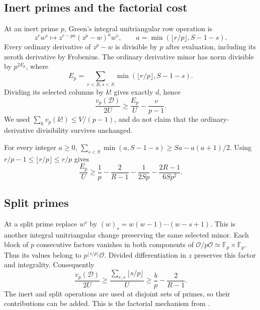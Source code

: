 \documentclass[11pt]{article}
\newcommand{\F}{\mathbb F}
\newcommand{\OO}{\mathcal O}
\begin{document}
\subsection{Inert primes and the factorial cost}
At an inert prime $p$, Green's integral unitriangular row operation is
\[
 z^rw^s\longmapsto z^{r-pa}(z^p-w)^aw^s,
 \qquad a=\min(\lfloor r/p\rfloor,S-1-s).
\]
Every ordinary derivative of $z^p-w$ is divisible by $p$ after
evaluation, including its zeroth derivative by Frobenius. The
ordinary derivative minor has norm divisible by $p^{2E_p}$, where
\[
 E_p=\sum_{r<R,s<S}\min(\lfloor r/p\rfloor,S-1-s).
\]
Dividing its selected columns by $k!$ gives exactly $d$, hence
\begin{equation}\label{eq:inert-raw}
 \frac{v_p(\mathcal D)}{2U}
 \ge\frac{E_p}{U}-\frac v{p-1}.
\end{equation}
We used $\sum_k v_p(k!)\le V/(p-1)$, and do not claim that
the ordinary-derivative divisibility survives unchanged.

For every integer $a\ge0$,
$\sum_{s<S}\min(a,S-1-s)\ge Sa-a(a+1)/2$.
Using $r/p-1\le\lfloor r/p\rfloor\le r/p$ gives
\begin{equation}\label{eq:E}
 \frac{E_p}{U}\ge
 \frac1p-\frac2{R-1}-\frac1{2Sp}
              -\frac{2R-1}{6Sp^2}.
\end{equation}

\subsection{Split primes}
At a split prime replace $w^s$ by
$(w)_s=w(w-1)\cdots(w-s+1)$. This is another integral
unitriangular change preserving the same selected minor. Each block
of $p$ consecutive factors vanishes in both components of
$\OO/p\OO\simeq\F_p\times\F_p$. Thus its values belong to
$p^{\lfloor s/p\rfloor}\OO$. Divided differentiation in $z$
preserves this factor and integrality. Consequently
\begin{equation}\label{eq:split}
 \frac{v_p(\mathcal D)}{2U}
 \ge\frac{\sum_{r,s}\lfloor s/p\rfloor}{U}
 \ge\frac bp-\frac2{R-1}.
\end{equation}
The inert and split operations are used at disjoint sets of primes,
so their contributions can be added. This is the factorial mechanism
from \cite[Section 4.3]{v7}.
\end{document}
